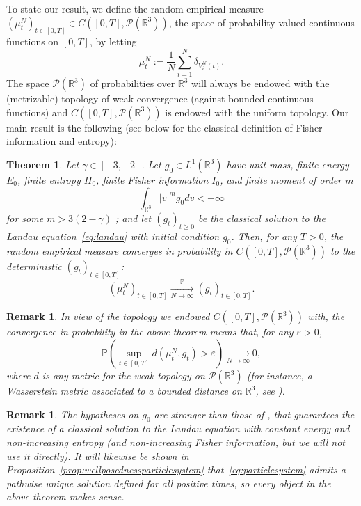 \documentclass[11pt,a4paper]{article}
\theoremstyle{definition}
\theoremstyle{plain}
\newtheorem{theorem}[defi]{Theorem}
\newtheorem{remark}[defi]{Remark}
\begin{document}
To state our result, we define the random empirical measure $(\mu^N_t)_{t\in[0,T]}\in C([0,T],\mathcal{P}(\mathbb{R}^3))$, the space of probability-valued continuous functions on $[0,T]$, by letting
$$\mu^N_t:=\frac{1}{N}\sum_{i=1}^N \delta_{V^N_i(t)}.$$
The space $\mathcal{P}(\mathbb{R}^3)$ of probabilities over $\mathbb{R}^3$ will always be endowed with the (metrizable) topology of weak convergence (against bounded continuous functions) and $C([0,T],\mathcal{P}(\mathbb{R}^3))$ is endowed with the uniform topology.
Our main result is the following (see below for the classical definition of Fisher information and entropy):
\begin{theorem}
    \label{thm:main}
    Let $ \gamma\in[-3,-2]$. Let $g_0\in L^1(\mathbb{R}^3)$ have unit mass, finite energy $E_0$, finite entropy $H_0$, finite Fisher information $I_0$, and finite moment of order $m$
    \begin{equation*}
    \int_{\mathbb{R}^3} \vert v\vert^m g_0 dv <+\infty
    \end{equation*}
    for some $m> 3(2-\gamma)$ ; and let $(g_t)_{t\geq 0}$ be the classical solution to the Landau equation~\eqref{eq:landau} with initial condition $g_0$. 
    Then, for any $T>0$, the random empirical measure converges in probability in $ C([0,T],\mathcal{P}(\mathbb{R}^3))$ to the deterministic $(g_t)_{t\in[0,T]}$:
    \begin{equation*}
    \label{eq:maingoal}
        (\mu^N_t)_{t\in[0,T]} \xrightarrow[N\rightarrow \infty]{\mathbb{P}}(g_t)_{t\in[0,T]}.
    \end{equation*}
    
\end{theorem}
\begin{remark}
    In view of the topology we endowed $ C([0,T],\mathcal{P}(\mathbb{R}^3))$ with, the convergence in probability in the above theorem means that, for any $\varepsilon>0$,
    $$\mathbb{P}\left( \sup_{t\in[0,T]} d\left(\mu^N_t,g_t\right)>\varepsilon\right)\xrightarrow[N\rightarrow \infty]{}0,$$
    where $d$ is any metric for the weak topology on $\mathcal{P}(\mathbb{R}^3)$ (for instance, a Wasserstein metric associated to a bounded distance on $\mathbb{R}^3$, see \cite[Theorem 6.9, Corollary 6.13]{Villani2009}).
\end{remark}
\begin{remark}
\label{rem:postthm}
    The hypotheses on $g_0$ are stronger than those of \cite[Theorem 1.5]{Ji2024}, that guarantees the existence of a classical solution to the Landau equation with constant energy and non-increasing entropy (and non-increasing Fisher information, but we will not use it directly). It will likewise be shown in Proposition~\ref{prop:wellposednessparticlesystem} that~\eqref{eq:particlesystem} admits a pathwise unique solution defined for all positive times, so every object in the above theorem makes sense.
\end{remark}
\end{document}
